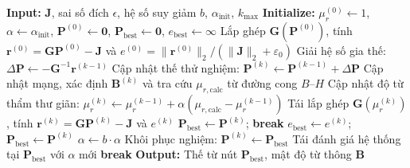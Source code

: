\begin{algorithm}[htbp]
\caption{Bộ giải phi tuyến 3D-MBGRN với cơ chế quay lui thích nghi}
\label{alg:nonlinear}
\begin{algorithmic}[1]
\STATE \textbf{Input:} $\mathbf{J}$, sai số đích $\epsilon$, hệ số suy giảm $b$, $\alpha_{\text{init}}$, $k_{\max}$
\STATE \textbf{Initialize:} $\mu_r^{(0)} \leftarrow 1$, $\alpha \leftarrow \alpha_{\text{init}}$, $\mathbf{P}^{(0)} \leftarrow \mathbf{0}$, $\mathbf{P}_{\text{best}} \leftarrow \mathbf{0}$, $e_{\text{best}} \leftarrow \infty$
\STATE Lắp ghép $\mathbf{G}(\mathbf{P}^{(0)})$, tính $\mathbf{r}^{(0)} = \mathbf{G}\mathbf{P}^{(0)} - \mathbf{J}$ và $e^{(0)} = \|\mathbf{r}^{(0)}\|_2 / (\|\mathbf{J}\|_2 + \varepsilon_0)$
    \STATE Giải hệ số gia thế: $\Delta \mathbf{P} \leftarrow -\mathbf{G}^{-1} \mathbf{r}^{(k-1)}$
    \STATE Cập nhật thế thử nghiệm: $\mathbf{P}^{(k)} \leftarrow \mathbf{P}^{(k-1)} + \Delta \mathbf{P}$
    \STATE Cập nhật mạng, xác định $\mathbf{B}^{(k)}$ và tra cứu $\mu_{r,\text{calc}}$ từ đường cong $B\text{--}H$
    \STATE Cập nhật độ từ thẩm thư giãn: $\mu_r^{(k)} \leftarrow \mu_r^{(k-1)} + \alpha (\mu_{r,\text{calc}} - \mu_r^{(k-1)})$
    \STATE Tái lắp ghép $\mathbf{G}(\mu_r^{(k)})$, tính $\mathbf{r}^{(k)} = \mathbf{G}\mathbf{P}^{(k)} - \mathbf{J}$ và $e^{(k)}$
        \STATE $\mathbf{P}_{\text{best}} \leftarrow \mathbf{P}^{(k)}$; \textbf{break}
    \ENDIF
            \STATE $e_{\text{best}} \leftarrow e^{(k)}$; $\mathbf{P}_{\text{best}} \leftarrow \mathbf{P}^{(k)}$
        \ENDIF
    \ELSE
        \STATE $\alpha \leftarrow b \cdot \alpha$ 
        \STATE Khôi phục nghiệm: $\mathbf{P}^{(k)} \leftarrow \mathbf{P}_{\text{best}}$
        \STATE Tái đánh giá hệ thống tại $\mathbf{P}_{\text{best}}$ với $\alpha$ mới
    \ENDIF
        \STATE \textbf{break} 
    \ENDIF
\ENDFOR
\STATE \textbf{Output:} Thế từ nút $\mathbf{P}_{\text{best}}$, mật độ từ thông $\mathbf{B}$
\end{algorithmic}
\end{algorithm}